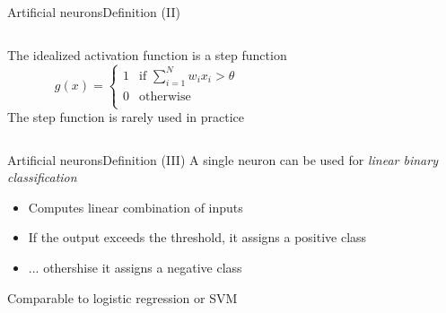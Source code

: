 \documentclass[10pt,compress]{beamer} %
\begin{document}
\begin{frame}{Artificial neurons}{Definition (II)}
	\begin{columns}
	The idealized activation function is a step function
	\begin{equation*}
	g(x) =
	  \begin{cases}
	      	1  & \text{if } \sum_{i=1}^{N} w_i x_i > \theta\\
	  	0  & \text{otherwise}\\
	  \end{cases}
	\end{equation*}
	The step function is rarely used in practice

 	\end{columns}

\end{frame}

\begin{frame}{Artificial neurons}{Definition (III)}
	A single neuron can be used for \textit{linear binary classification}
	\begin{itemize}
	\item Computes linear combination of inputs
	\item If the output exceeds the threshold, it assigns a positive class
	\item ... othershise it assigns a negative class
	\end{itemize}

	Comparable to logistic regression or SVM
\end{frame}
\end{document}
